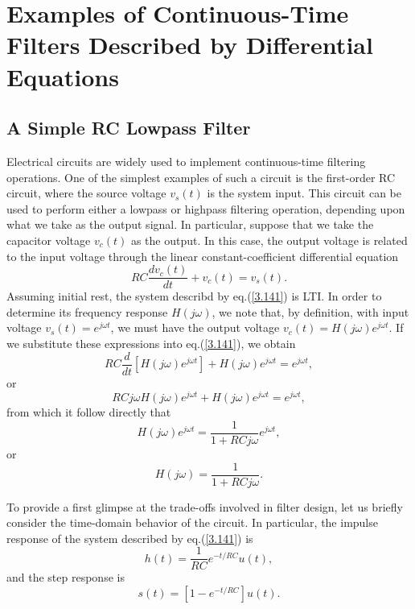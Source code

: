 \documentclass[a4paper,10pt,twoside]{book}
\begin{document}
\section{Examples of Continuous-Time Filters Described by Differential Equations}
\label{section:3.10}

\subsection{A Simple RC Lowpass Filter}

Electrical circuits are widely used to implement continuous-time filtering operations. One of the simplest examples of such a circuit is the first-order RC circuit, where the source voltage $v_s(t)$ is the system input. This circuit can be used to perform either a lowpass or highpass filtering operation, depending upon what we take as the output signal. In particular, suppose that we take the capacitor voltage $v_c(t)$ as the output. In this case, the output voltage is related to the input voltage through the linear constant-coefficient differential equation
\begin{equation}
    RC\frac{dv_c(t)}{dt}+v_c(t)=v_s(t).
    \label{3.141}
\end{equation}
Assuming initial rest, the system describd by eq.\;(\ref{3.141}) is LTI. In order to determine its frequency response $H(j\omega)$, we note that, by definition, with input voltage $v_s(t)=e^{j\omega t}$, we must have the output voltage $v_c(t)=H(j\omega)e^{j\omega t}$. If we substitute these expressions into eq.\;(\ref{3.141}), we obtain
\begin{equation}
    RC\frac d{dt}[H(j\omega)e^{j\omega t}]+H(j\omega)e^{j\omega t}=e^{j\omega t},
    \label{3.142}
\end{equation}
or
\begin{equation}
    RCj\omega H(j\omega)e^{j\omega t}+H(j\omega)e^{j\omega t}=e^{j\omega t},
    \label{3.143}
\end{equation}
from which it follow directly that
\begin{equation}
    H(j\omega)e^{j\omega t}=\frac1{1+RCj\omega}e^{j\omega t},
    \label{3.144}
\end{equation}
or
\begin{equation}
    H(j\omega)=\frac1{1+RCj\omega}.
    \label{3.145}
\end{equation}

To provide a first glimpse at the trade-offs involved in filter design, let us briefly consider the time-domain behavior of the circuit. In particular, the impulse response of the system described by eq.\;(\ref{3.141}) is
\begin{equation}
    h(t)=\frac1{RC}e^{-t/RC}u(t),
    \label{3.146}
\end{equation}
and the step response is
\begin{equation}
    s(t)=[1-e^{-t/RC}]u(t).
    \label{3.147}
\end{equation}
\end{document}

